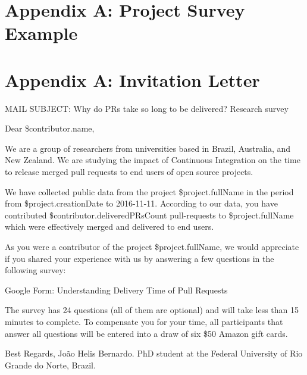 	
	\newpage
	\appendix
	
	\section*{Appendix A: Project Survey Example}
	\label{sec:appendix_project_survey_example}
	
	
	
	\section*{Appendix A: Invitation Letter}
	\label{sec:appendix_invitation_latter}
	
	MAIL SUBJECT: Why do PRs take so long to be delivered? Research survey
	
	Dear \${contributor.name},
	
	We are a group of researchers from universities based in Brazil, Australia, and New Zealand. We are studying the impact of Continuous Integration on the time to release merged pull requests to end users of open source projects.
	
	We have collected public data from the project \${project.fullName} in the period from \${project.creationDate} to 2016-11-11. According to our data, you have contributed \${contributor.deliveredPRsCount} pull-requests to \${project.fullName} which were effectively merged and delivered to end users. 
	
	As you were a contributor of the project \${project.fullName}, we would appreciate if you shared your experience with us by answering a few questions in the following survey: 
	
	Google Form: Understanding Delivery Time of Pull Requests
	
	The survey has 24 questions (all of them are optional) and will take less than 15 minutes to complete. To compensate you for your time, all participants that answer all questions will be entered into a draw of six \$50 Amazon gift cards.
	
	Best Regards,
	João Helis Bernardo.
	PhD student at the Federal University of Rio Grande do Norte, Brazil.
	
	
	
	
	
	
	

